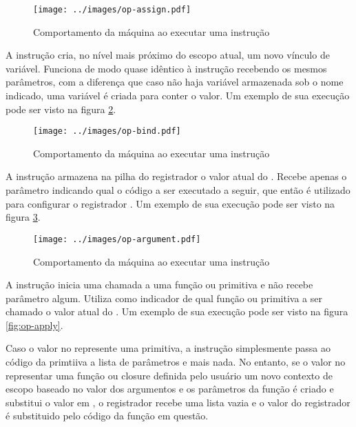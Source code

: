 \begin{figure}[h!]
\centering
\texttt{[image: ../images/op-assign.pdf]}
\caption{Comportamento da máquina ao executar uma instrução }
\label{fig:op-assign}
\end{figure}


A instrução   cria, no nível mais próximo do escopo
atual, um novo vínculo de variável. Funciona de modo quase idêntico à instrução
 recebendo os mesmos parâmetros, com a diferença que caso não haja
variável armazenada sob o nome indicado, uma variável é criada para conter o
valor. Um exemplo de sua execução pode ser visto na figura
\ref{fig:op-bind}.

\begin{figure}[h!]
\centering
\texttt{[image: ../images/op-bind.pdf]}
\caption{Comportamento da máquina ao executar uma instrução }
\label{fig:op-bind}
\end{figure}


A instrução   armazena na pilha do
registrador  o valor atual do . Recebe apenas o
parâmetro  indicando qual o código a ser executado a seguir, que
então é utilizado para configurar o registrador .  Um exemplo de sua execução pode ser visto na figura
\ref{fig:op-argument}.


\begin{figure}[h!]
\centering
\texttt{[image: ../images/op-argument.pdf]}
\caption{Comportamento da máquina ao executar uma instrução }
\label{fig:op-argument}
\end{figure}


A instrução   inicia uma chamada a uma função ou primitiva e não
recebe parâmetro algum. Utiliza como indicador de qual função ou primitiva a
ser chamado o valor atual do . Um exemplo de sua execução pode
ser visto na figura \ref{fig:op-apply}. 

Caso o valor no  represente uma primitiva, a instrução
simplesmente passa ao código da primtiiva a lista de parâmetros e mais nada. No
entanto, se o valor no  representar uma função ou closure
definida pelo usuário um novo contexto de escopo baseado no valor dos
argumentos e os parâmetros da função é criado e substitui o valor em
, o registrador  recebe uma lista vazia e o valor
do registrador  é substituido pelo código da função em questão. 

